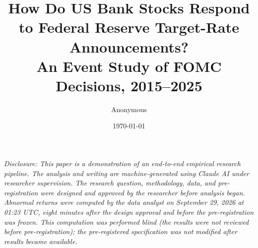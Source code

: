 \documentclass[11pt]{article}
\title{How Do US Bank Stocks Respond to Federal Reserve Target-Rate Announcements?\\
An Event Study of FOMC Decisions, 2015--2025}
\author{Anonymous}
\date{\today}
\begin{document}
\maketitle

\begin{center}
\small \textit{Disclosure: This paper is a demonstration of an end-to-end empirical research pipeline. The analysis and writing are machine-generated using Claude AI under researcher supervision. The research question, methodology, data, and pre-registration were designed and approved by the researcher before analysis began. Abnormal returns were computed by the data analyst on September 29, 2026 at 01:23 UTC, eight minutes after the design approval and before the pre-registration was frozen. This computation was performed blind (the results were not reviewed before pre-registration); the pre-registered specification was not modified after results became available.}
\end{center}
\end{document}
